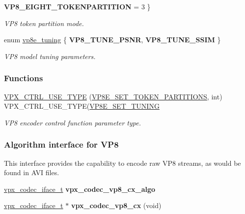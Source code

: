 \begin{DoxyCompactItemize}
{\bfseries V\-P8\-\_\-\-E\-I\-G\-H\-T\-\_\-\-T\-O\-K\-E\-N\-P\-A\-R\-T\-I\-T\-I\-O\-N} = 3
 \}
\begin{DoxyCompactList}\small\item\em V\-P8 token partition mode. \end{DoxyCompactList}\item 
enum \hyperlink{group__vp8__encoder_ga371dbc29054b3d46364af996ad42ab94}{vp8e\-\_\-tuning} \{ {\bfseries V\-P8\-\_\-\-T\-U\-N\-E\-\_\-\-P\-S\-N\-R}, 
{\bfseries V\-P8\-\_\-\-T\-U\-N\-E\-\_\-\-S\-S\-I\-M}
 \}
\begin{DoxyCompactList}\small\item\em V\-P8 model tuning parameters. \end{DoxyCompactList}\end{DoxyCompactItemize}
\subsubsection*{Functions}
\begin{DoxyCompactItemize}
\item 
\hyperlink{group__vp8__encoder_gafdd19c923e5a9457928d924823d1c5f4}{V\-P\-X\-\_\-\-C\-T\-R\-L\-\_\-\-U\-S\-E\-\_\-\-T\-Y\-P\-E} (\hyperlink{group__vp8__encoder_gga6deae3d561c838952552c3d3756322eca462a4f14f39a6eb5c4a4004fc8d0ad75}{V\-P8\-E\-\_\-\-S\-E\-T\-\_\-\-T\-O\-K\-E\-N\-\_\-\-P\-A\-R\-T\-I\-T\-I\-O\-N\-S}, int) V\-P\-X\-\_\-\-C\-T\-R\-L\-\_\-\-U\-S\-E\-\_\-\-T\-Y\-P\-E(\hyperlink{group__vp8__encoder_gga6deae3d561c838952552c3d3756322eca126ccbe7bde63b59cec5ea68a82dd498}{V\-P8\-E\-\_\-\-S\-E\-T\-\_\-\-T\-U\-N\-I\-N\-G}
\begin{DoxyCompactList}\small\item\em V\-P8 encoder control function parameter type. \end{DoxyCompactList}\end{DoxyCompactItemize}
\subsubsection*{Algorithm interface for V\-P8}
\label{_amgrp0b829b38ff2e659173b35cd78e0735bd}%
This interface provides the capability to encode raw V\-P8 streams, as would be found in A\-V\-I files. \begin{DoxyCompactItemize}
\item 
\hypertarget{group__vp8__encoder_ga689ede372ab835c8e1c9631f17b47eb5}{\hyperlink{group__codec_gad654f3da60151f5dfef70aca00ef1e9e}{vpx\-\_\-codec\-\_\-iface\-\_\-t} {\bfseries vpx\-\_\-codec\-\_\-vp8\-\_\-cx\-\_\-algo}}\label{group__vp8__encoder_ga689ede372ab835c8e1c9631f17b47eb5}

\item 
\hypertarget{group__vp8__encoder_ga1b5362d0d5b5a2d50f173f9c160fad9f}{\hyperlink{group__codec_gad654f3da60151f5dfef70aca00ef1e9e}{vpx\-\_\-codec\-\_\-iface\-\_\-t} $\ast$ {\bfseries vpx\-\_\-codec\-\_\-vp8\-\_\-cx} (void)}\label{group__vp8__encoder_ga1b5362d0d5b5a2d50f173f9c160fad9f}

\end{DoxyCompactItemize}


